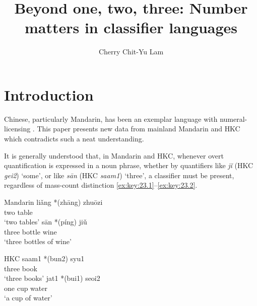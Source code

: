 \documentclass[output=paper]{langsci/langscibook}
\author{Cherry Chit-Yu Lam\affiliation{The Open University of Hong Kong}}
\title{Beyond one, two, three: Number matters in classifier languages}
\begin{document}
\glsresetall

\section{Introduction}

Chinese, particularly Mandarin, has been an exemplar
language with numeral-licensing . This paper presents new data from
mainland Mandarin and \gls{HKC} which contradicts such
a neat understanding.

It is generally understood that, in Mandarin and \gls{HKC}, whenever overt quantification is expressed in a noun phrase,
whether by quantifiers like \emph{jǐ} (\gls{HKC} \emph{gei2}) ‘some’, or
 like \emph{sān} (\gls{HKC} \emph{saam1}) ‘three’, a
classifier must be present, regardless of mass-count
distinction \eqref{ex:key:23.1}--\eqref{ex:key:23.2}.

\ea\label{ex:key:23.1}Mandarin \parencites[92]{Chierchia1998}[519]{ChengSybesma1999} %
	\ea
    \gll    liǎng *(zhāng) zhuōzi\\
            two \hphantom{*(}\Clf{} table\\
	\glt    \enquote*{two tables}
	\ex
    \gll    sān *(píng) jiǔ\\
            three \hphantom{*(}bottle  wine\\
    \glt    ‘three bottles of wine’
	\z
\z

\ea\label{ex:key:23.2}\gls{HKC} \parencites[14]{Sio2006}[272]{ChengSybesma2005}%
	\ea
	\gll saam1 *(bun2) syu1\\
    three \hphantom{*(}\Clf{}  book\\
	\glt ‘three books’
	\ex
	\gll jat1 *(bui1) seoi2\\
    one \hphantom{*(}cup water\\
    \glt ‘a cup of water’
	\z
\z
\end{document}
